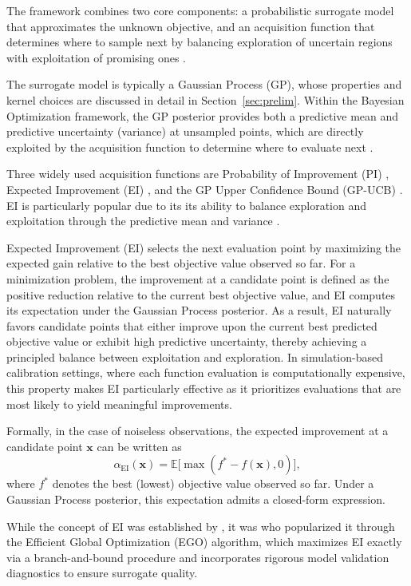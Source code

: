 \documentclass[11pt]{article}
\begin{document}
The framework combines two core components: a probabilistic surrogate model that approximates the unknown objective, and an acquisition function that determines where to sample next by balancing exploration of uncertain regions with exploitation of promising ones \parencite{shahriari2016}.

The surrogate model is typically a Gaussian Process (GP), whose properties and kernel choices are discussed in detail in  Section~\ref{sec:prelim}. Within the Bayesian Optimization framework, the GP posterior provides both a predictive mean and predictive uncertainty (variance) at unsampled points, which are directly exploited by the acquisition function to determine where to evaluate next \parencite{garnett2023bayesian}.

Three widely used acquisition functions are Probability of Improvement (PI) \parencite{kushner1964}, Expected Improvement (EI) \parencite{mockus1978}, and the GP Upper Confidence Bound (GP-UCB) \parencite{srinivas2010}. EI is particularly popular due to its its ability to balance exploration and exploitation through the predictive mean and variance \parencite{shahriari2016}. 


Expected Improvement (EI) selects the next evaluation point by maximizing the expected gain relative to the best objective value observed so far. For a minimization problem, the improvement at a candidate point is defined as the positive reduction relative to the current best objective value, and EI computes its expectation under the Gaussian Process posterior. As a result, EI naturally favors candidate points that either improve upon the current best predicted objective value or exhibit high predictive uncertainty, thereby achieving a principled balance between exploitation and exploration. In simulation-based calibration settings, where each function evaluation is computationally expensive, this property makes EI particularly effective as it prioritizes evaluations that are most likely to yield meaningful improvements.

Formally, in the case of noiseless observations, the expected improvement at a candidate point $\mathbf{x}$ can be written as
\[
\alpha_{\text{EI}}(\mathbf{x}) = \mathbb{E}\big[ \max(f^* - f(\mathbf{x}), 0) \big],
\]
where $f^*$ denotes the best (lowest) objective value observed so far.
\label{sec:ei}
Under a Gaussian Process posterior, this expectation admits a closed-form expression\parencite{garnett2023bayesian}.


While the concept of EI was established by \textcite{mockus1978}, it was \textcite{jones1998ego} who popularized it through the Efficient Global Optimization (EGO) algorithm, which maximizes EI exactly via a branch-and-bound procedure and incorporates rigorous model validation diagnostics to ensure surrogate quality.
\end{document}

